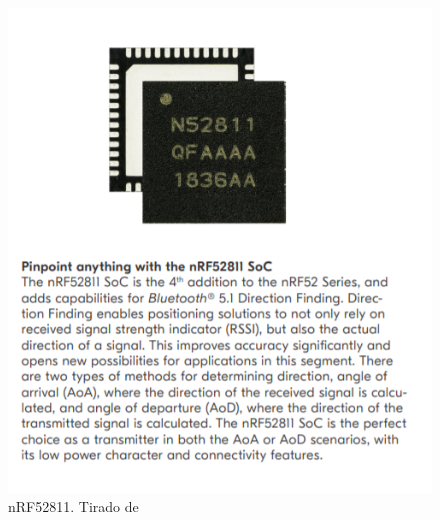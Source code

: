 \begin{figure}[H]
	\centering
	\includegraphics[scale = 1]{images/nRF52811.png}
	\caption{nRF52811. Tirado de \cite{nRF52811_site}}
	\label{fig:nRF52811}
\end{figure}


